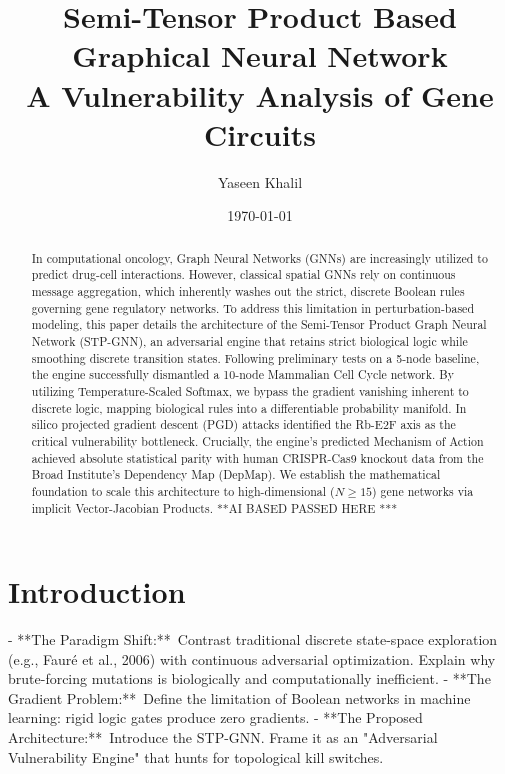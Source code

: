 \documentclass[11pt, letterpaper]{article}
\title{Semi-Tensor Product Based Graphical Neural Network \\ \large A Vulnerability Analysis of Gene Circuits}
\author{Yaseen Khalil}
\date{\today}
\begin{document}
	\maketitle
	
	\begin{abstract}
		In computational oncology, Graph Neural Networks (GNNs) are increasingly utilized to predict drug-cell interactions. However, classical spatial GNNs rely on continuous message aggregation, which inherently washes out the strict, discrete Boolean rules governing gene regulatory networks. To address this limitation in perturbation-based modeling, this paper details the architecture of the Semi-Tensor Product Graph Neural Network (STP-GNN), an adversarial engine that retains strict biological logic while smoothing discrete transition states. Following preliminary tests on a 5-node baseline, the engine successfully dismantled a 10-node Mammalian Cell Cycle network. By utilizing Temperature-Scaled Softmax, we bypass the gradient vanishing inherent to discrete logic, mapping biological rules into a differentiable probability manifold. In silico projected gradient descent (PGD) attacks identified the Rb-E2F axis as the critical vulnerability bottleneck. Crucially, the engine's predicted Mechanism of Action achieved absolute statistical parity with human CRISPR-Cas9 knockout data from the Broad Institute's Dependency Map (DepMap). We establish the mathematical foundation to scale this architecture to high-dimensional ($N\ge15$) gene networks via implicit Vector-Jacobian Products.\newline
		\newline
		\large \centering ***AI BASED PASSED HERE ***
	\end{abstract}
	
	

	\section{Introduction}
- **The Paradigm Shift:** Contrast traditional discrete state-space exploration (e.g., Fauré et al., 2006) with continuous adversarial optimization. Explain why brute-forcing mutations is biologically and computationally inefficient.\newline
- **The Gradient Problem:** Define the limitation of Boolean networks in machine learning: rigid logic gates produce zero gradients.\newline
- **The Proposed Architecture:** Introduce the STP-GNN. Frame it as an "Adversarial Vulnerability Engine" that hunts for topological kill switches.
	
\end{document}
